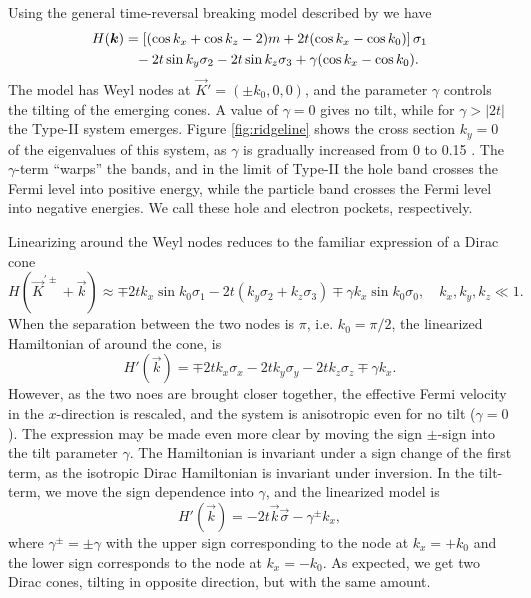 Using the general time-reversal breaking model described by \citeauthor{mccormickMinimalModelsTopological2017} we have
\begin{equation}
  \begin{split}
    H(\vec{k}) &= \left[ ( \cos k_x + \cos k_z - 2 )m + 2 t (\cos k_x - \cos k_0) \right] \sigma_1\\
    &\pe - 2 t \sin k_y \sigma_2 - 2t \sin k_z \sigma_3
    + \gamma (\cos k_x - \cos k_0).
  \end{split}
\end{equation}
The model has Weyl nodes at \(\vec{K}' = (\pm k_{0}, 0,0)\), and the parameter $\gamma$ controls the tilting of the emerging cones.
A value of $\gamma=0$ gives no tilt, while for $\gamma > |2 t|$ the Type-II system emerges.
Figure \ref{fig:ridgeline} shows the cross section \(k_{y} = 0\) of the eigenvalues of this system, as \(\gamma\) is gradually increased from 0 to 0.15 .
The \(\gamma\)-term ``warps'' the bands, and in the limit of Type-II the hole band crosses the Fermi level into positive energy, while the particle band crosses the Fermi level into negative energies.
We call these hole and electron pockets, respectively.

Linearizing around the Weyl nodes reduces to the familiar expression of a Dirac cone
\begin{equation}
  \label{eq:37}
  H(\vec{K} ^{'\pm} + \vec{k}) \approx \mp 2 t k_{x} \sin k_{0} \sigma_{1} - 2 t (k_{y} \sigma_{2} + k_{z} \sigma_{3}) \mp \gamma k_{x} \sin k_{0} \sigma_{0}, \quad k_{x}, k_{y}, k_{z} \ll 1.
\end{equation}
When the separation between the two nodes is \(\pi\), i.e. \(k_{0} = \pi/ 2 \), the linearized Hamiltonian of around the cone, is
\begin{equation}
  \label{eq:38}
  H'(\vec{k}) = \mp 2 t k_{x} \sigma_{x} - 2t k_{y} \sigma_{y} - 2 t k_{z} \sigma_{z} \mp \gamma k_{x}.
\end{equation}
However, as the two noes are brought closer together, the effective Fermi velocity in the \(x\)-direction is rescaled, and the system is anisotropic even for no tilt (\(\gamma=0\)).
The expression may be made even more clear by moving the sign \(\pm\)-sign into the tilt parameter \(\gamma\).
The Hamiltonian is invariant under a sign change of the first term, as the isotropic Dirac Hamiltonian is invariant under inversion.
In the tilt-term, we move the sign dependence into \(\gamma \), and the linearized model is
\begin{equation}
  \label{eq:39}
  H'(\vec{k}) = - 2t \vec{k} \vec{\sigma} - \gamma^{\pm} k_{x},
\end{equation}
where \(\gamma ^{\pm} = \pm \gamma \) with the upper sign corresponding to the node at \(k_{x} = + k_{0}\) and the lower sign corresponds to the node at \(k_{x} = - k_{0}\).
As expected, we get two Dirac cones, tilting in opposite direction, but with the same amount.

